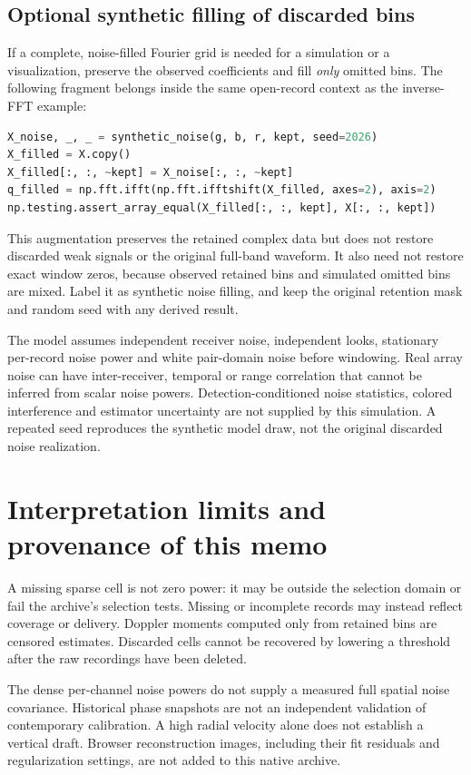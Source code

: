 \documentclass[11pt]{article}
\begin{document}
\subsection{Optional synthetic filling of discarded bins}
If a complete, noise-filled Fourier grid is needed for a simulation or a
visualization, preserve the observed coefficients and fill \emph{only} omitted
bins. The following fragment belongs inside the same open-record context as
the inverse-FFT example:
\begin{lstlisting}[language=Python]
X_noise, _, _ = synthetic_noise(g, b, r, kept, seed=2026)
X_filled = X.copy()
X_filled[:, :, ~kept] = X_noise[:, :, ~kept]
q_filled = np.fft.ifft(np.fft.ifftshift(X_filled, axes=2), axis=2)
np.testing.assert_array_equal(X_filled[:, :, kept], X[:, :, kept])
\end{lstlisting}
This augmentation preserves the retained complex data but does not restore
discarded weak signals or the original full-band waveform. It also need not
restore exact window zeros, because observed retained bins and simulated
omitted bins are mixed. Label it as synthetic noise filling, and keep the
original retention mask and random seed with any derived result.

The model assumes independent receiver noise, independent looks, stationary
per-record noise power and white pair-domain noise before windowing. Real
array noise can have inter-receiver, temporal or range correlation that cannot
be inferred from scalar noise powers. Detection-conditioned noise statistics,
colored interference and estimator uncertainty are not supplied by this
simulation. A repeated seed reproduces the synthetic model draw, not the
original discarded noise realization.

\section{Interpretation limits and provenance of this memo}

A missing sparse cell is not zero power: it may be outside the selection
domain or fail the archive's selection tests. Missing or incomplete records
may instead reflect coverage or delivery. Doppler moments computed only from
retained bins are censored estimates. Discarded cells cannot be recovered by
lowering a threshold after the raw recordings have been deleted.

The dense per-channel noise powers do not supply a measured full spatial noise
covariance. Historical phase snapshots are not an independent validation of
contemporary calibration. A high radial velocity alone does not establish a
vertical draft. Browser reconstruction images, including their fit residuals
and regularization settings, are not added to this native archive.
\end{document}
